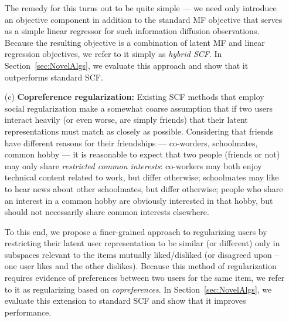 \documentclass{sig-alternate}
\begin{document}
\begin{enumerate}
The remedy for
this turns out to be quite simple --- we need only introduce an
objective component in addition to the standard MF objective that
serves as a simple linear regressor for such information diffusion
observations.  Because the resulting objective is a combination of
latent MF and linear regression objectives, we refer to it simply as
\emph{hybrid SCF}.  In Section~\ref{sec:NovelAlgs}, we evaluate this
approach and show that it outperforms standard SCF.
\item[(c)] {\bf Copreference regularization:} Existing SCF methods
that employ social regularization make a somewhat coarse assumption
that if two users interact heavily (or even worse, are simply friends)
that their latent representations must match as closely as possible.
Considering that friends have different reasons for their friendships
--- co-worders, schoolmates, common hobby --- it is reasonable to
expect that two people (friends or not) may only share
\emph{restricted common interests}: co-workers may both enjoy
technical content related to work, but differ otherwise; schoolmates
may like to hear news about other schoolmates, but differ otherwise;
people who share an interest in a common hobby are obviously
interested in that hobby, but should not necessarily share common
interests elsewhere.  

To this end, we propose a finer-grained approach
to regularizing users by restricting their latent user representation
to be similar (or different) only in subspaces relevant to the items
mutually liked/disliked (or disagreed upon -- one user likes and the
other dislikes).  Because this method of regularization requires
evidence of preferences between two users for the same item, we refer
to it as regularizing based on \emph{copreferences}.
In Section~\ref{sec:NovelAlgs}, we evaluate this extension to standard
SCF and show that it improves performance.
\end{enumerate}
\end{document}

